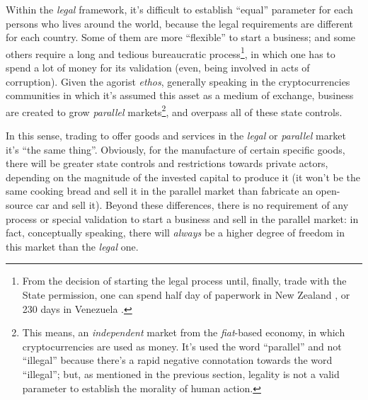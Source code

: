 \documentclass[12pt,a4paper]{article}
\begin{document}
Within the \textit{legal} framework, it's difficult to establish “equal” parameter for each persons who lives around the world, because the legal requirements are different for each country. Some of them are more “flexible” to start a business; and some others require a long and tedious bureaucratic process\footnote{From the decision of starting the legal process until, finally, trade with the State permission, one can spend half day of paperwork in New Zealand \cite[p.~4]{db:newzealand}, or 230 days in Venezuela \cite[p.~4]{db:venezuela}.}, in which one has to spend a lot of money for its validation (even, being involved in acts of corruption). Given the agorist \textit{ethos}, generally speaking in the cryptocurrencies communities in which it's assumed this asset as a medium of exchange, business are created to grow \textit{parallel} markets\footnote{This means, an \textit{independent} market from the \textit{fiat}-based economy, in which cryptocurrencies are used as money. It's used the word “parallel” and not “illegal” because there's a rapid negative connotation towards the word “illegal”; but, as mentioned in the previous section, legality is not a valid parameter to establish the morality of human action.}, and overpass all of these state controls.

In this sense, trading to offer goods and services in the \textit{legal} or \textit{parallel} market it's “the same thing”. Obviously, for the manufacture of certain specific goods, there will be greater state controls and restrictions towards private actors, depending on the magnitude of the invested capital to produce it (it won't be the same cooking bread and sell it in the parallel market than fabricate an open-source car and sell it). Beyond these differences, there is no requirement of any process or special validation to start a business and sell in the parallel market: in fact, conceptually speaking, there will \textit{always} be a higher degree of freedom in this market than the \textit{legal} one.
\end{document}
